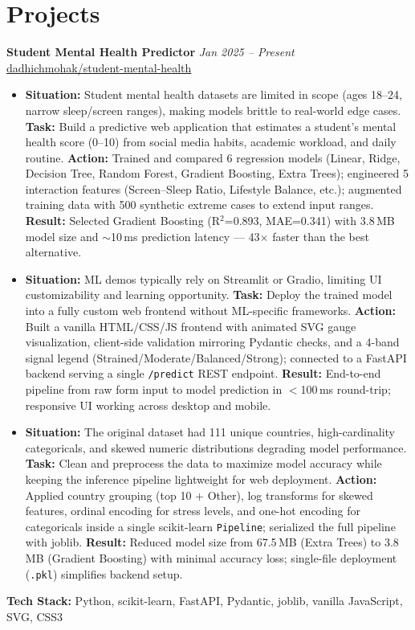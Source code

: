 \documentclass[11pt,a4paper]{article}
\newcommand{\project}[2]{\textbf{#1} \hfill \textit{#2}}
\begin{document}
\section{Projects}

\project{Student Mental Health Predictor}{Jan 2025 -- Present}
\hfill \faGithub \href{https://github.com/dadhichmohak/student-mental-health}{dadhichmohak/student-mental-health}

\begin{itemize}[leftmargin=*, nosep, itemsep=4pt]

  \item \textbf{Situation:} Student mental health datasets are limited in scope (ages 18--24, narrow sleep/screen ranges), making models brittle to real-world edge cases.
  \textbf{Task:} Build a predictive web application that estimates a student's mental health score (0--10) from social media habits, academic workload, and daily routine.
  \textbf{Action:} Trained and compared 6 regression models (Linear, Ridge, Decision Tree, Random Forest, Gradient Boosting, Extra Trees); engineered 5 interaction features (Screen--Sleep Ratio, Lifestyle Balance, etc.); augmented training data with 500 synthetic extreme cases to extend input ranges.
  \textbf{Result:} Selected Gradient Boosting (R$^2$=0.893, MAE=0.341) with 3.8\,MB model size and $\sim$10\,ms prediction latency --- 43$\times$ faster than the best alternative.

  \item \textbf{Situation:} ML demos typically rely on Streamlit or Gradio, limiting UI customizability and learning opportunity.
  \textbf{Task:} Deploy the trained model into a fully custom web frontend without ML-specific frameworks.
  \textbf{Action:} Built a vanilla HTML/CSS/JS frontend with animated SVG gauge visualization, client-side validation mirroring Pydantic checks, and a 4-band signal legend (Strained/Moderate/Balanced/Strong); connected to a FastAPI backend serving a single \texttt{/predict} REST endpoint.
  \textbf{Result:} End-to-end pipeline from raw form input to model prediction in $<$100\,ms round-trip; responsive UI working across desktop and mobile.

  \item \textbf{Situation:} The original dataset had 111 unique countries, high-cardinality categoricals, and skewed numeric distributions degrading model performance.
  \textbf{Task:} Clean and preprocess the data to maximize model accuracy while keeping the inference pipeline lightweight for web deployment.
  \textbf{Action:} Applied country grouping (top 10 + Other), log transforms for skewed features, ordinal encoding for stress levels, and one-hot encoding for categoricals inside a single scikit-learn \texttt{Pipeline}; serialized the full pipeline with joblib.
  \textbf{Result:} Reduced model size from 67.5\,MB (Extra Trees) to 3.8\,MB (Gradient Boosting) with minimal accuracy loss; single-file deployment (\texttt{.pkl}) simplifies backend setup.

\end{itemize}

\vspace{4pt}
\noindent\textbf{Tech Stack:} Python, scikit-learn, FastAPI, Pydantic, joblib, vanilla JavaScript, SVG, CSS3
\end{document}
